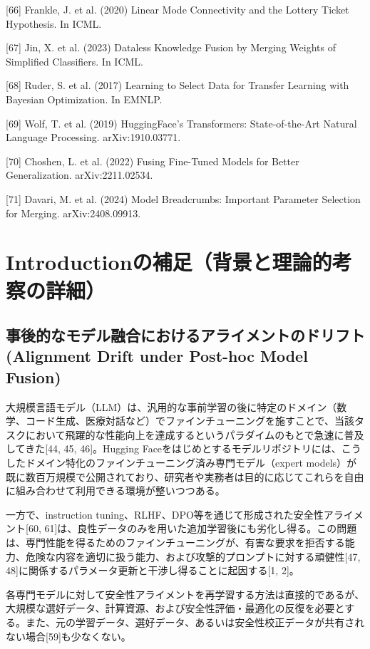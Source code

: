 \documentclass{article}
\begin{document}
{[66] Frankle, J. et al. (2020) Linear Mode Connectivity and the Lottery Ticket Hypothesis. In ICML.

[67] Jin, X. et al. (2023) Dataless Knowledge Fusion by Merging Weights of Simplified Classifiers. In ICML.

[68] Ruder, S. et al. (2017) Learning to Select Data for Transfer Learning with Bayesian Optimization. In EMNLP.

[69] Wolf, T. et al. (2019) HuggingFace's Transformers: State-of-the-Art Natural Language Processing. arXiv:1910.03771.

[70] Choshen, L. et al. (2022) Fusing Fine-Tuned Models for Better Generalization. arXiv:2211.02534.

[71] Davari, M. et al. (2024) Model Breadcrumbs: Important Parameter Selection for Merging. arXiv:2408.09913.
}



\appendix



\section{Introductionの補足（背景と理論的考察の詳細）}
\label{app:introduction}
\subsection{事後的なモデル融合におけるアライメントのドリフト(Alignment Drift under Post-hoc Model Fusion)
}
大規模言語モデル（LLM）は、汎用的な事前学習の後に特定のドメイン（数学、コード生成、医療対話など）でファインチューニングを施すことで、当該タスクにおいて飛躍的な性能向上を達成するというパラダイムのもとで急速に普及してきた[44, 45, 46]。Hugging Faceをはじめとするモデルリポジトリには、こうしたドメイン特化のファインチューニング済み専門モデル（expert models）が既に数百万規模で公開されており、研究者や実務者は目的に応じてこれらを自由に組み合わせて利用できる環境が整いつつある。

一方で、instruction tuning、RLHF、DPO等を通じて形成された安全性アライメント[60, 61]は、良性データのみを用いた追加学習後にも劣化し得る。この問題は、専門性能を得るためのファインチューニングが、有害な要求を拒否する能力、危険な内容を適切に扱う能力、および攻撃的プロンプトに対する頑健性[47, 48]に関係するパラメータ更新と干渉し得ることに起因する[1, 2]。

各専門モデルに対して安全性アライメントを再学習する方法は直接的であるが、大規模な選好データ、計算資源、および安全性評価・最適化の反復を必要とする。また、元の学習データ、選好データ、あるいは安全性校正データが共有されない場合[59]も少なくない。
\end{document}
